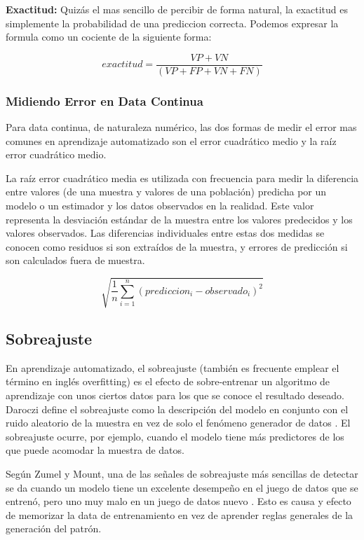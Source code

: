 \documentclass[letterpaper, spanish, 11pt]{report}
\begin{document}
\textbf{Exactitud:} Quizás el mas sencillo de percibir de forma natural, la exactitud es simplemente la probabilidad de una prediccion correcta. Podemos expresar la formula como un cociente de la siguiente forma:

\begin{equation}
exactitud = \frac{VP + VN}{(VP + FP + VN + FN)}
\end{equation}

\subsubsection{Midiendo Error en Data Continua}
Para data continua, de naturaleza numérico, las dos formas de medir el error mas comunes en aprendizaje automatizado son el error cuadrático medio y la raíz error cuadrático medio. 


La raíz error cuadrático media es utilizada con frecuencia para medir la diferencia entre valores (de una muestra y valores de una población) predicha por un modelo o un estimador y los datos observados en la realidad. Este valor representa la desviación estándar de la muestra entre los valores predecidos y los valores observados. Las diferencias individuales entre estas dos medidas se conocen como residuos si son extraídos de la muestra, y errores de predicción si son calculados fuera de muestra. 

\begin{equation}
\sqrt{\frac{1}{n}\sum_{i=1}^n(prediccion_{i} - observado_{i})^{2}}
\end{equation}

\subsection{Sobreajuste}
En aprendizaje automatizado, el sobreajuste (también es frecuente emplear el término en inglés overfitting) es el efecto de sobre-entrenar un algoritmo de aprendizaje con unos ciertos datos para los que se conoce el resultado deseado. Daroczi define el sobreajuste como la descripción del modelo en conjunto con el ruido aleatorio de la muestra en vez de solo el fenómeno generador de datos \cite{daroczi}. El sobreajuste ocurre, por ejemplo, cuando el modelo tiene más predictores de los que puede acomodar la muestra de datos.

Según Zumel y Mount, una de las señales de sobreajuste más sencillas de detectar se da cuando un modelo tiene un excelente desempeño en el juego de datos que se entrenó, pero uno muy malo en un juego de datos nuevo \cite{zumelMount}. Esto es causa y efecto de memorizar la data de entrenamiento en vez de aprender reglas generales de la generación del patrón. 
\end{document}
